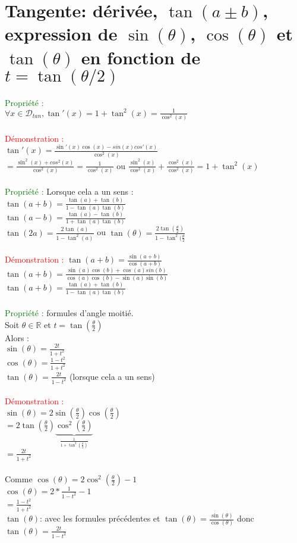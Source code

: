 \documentclass{article}
\begin{document}
	\section{Tangente: dérivée, $\tan (a \pm b)$, expression de $\sin(\theta)$, $\cos(\theta)$ et $\tan(\theta)$ en fonction de $t=\tan(\theta /2)$ }
	\textcolor{green}{Propriété :} \\
	\indent $\forall x \in \mathcal{D}_{tan}, \tan'(x)=1+\tan^2(x)= \frac{1}{\cos^2(x)}$ \\ \\
	\textcolor{red}{Démonstration :} \\
	\indent $\tan'(x)= \frac{\sin'(x)\cos(x)-sin(x)cos'(x)}{\cos^2(x)}$ \\
	\indent $=\frac{\sin^2(x)+cos^2(x)}{\cos^2(x)} = \frac{1}{\cos^2(x)}$ ou $\frac{\sin^2(x)}{\cos^2(x)} + \frac{\cos^2(x)}{\cos^2(x)}= 1 + \tan^2(x)$ \\ \\
	\textcolor{green}{Propriété :} Lorsque cela a un sens : \\
	\indent $\tan(a+b)=\frac{\tan(a)+\tan(b)}{1-\tan(a)\tan(b)}$ \\
	\indent $\tan(a-b)=\frac{\tan(a)-\tan(b)}{1+\tan(a)\tan(b)}$ \\
	\indent $\tan(2a)=\frac{2\tan(a)}{1-\tan^2(a)}$ ou $\tan(\theta)=\frac{2\tan(\frac{\theta}{2})}{1-\tan^2(\frac{\theta}{2}}$ \\\\
	\textcolor{red}{Démonstration :} $\tan(a+b)= \frac{\sin(a+b)}{\cos(a+b)}$ \\
	\indent$\tan(a+b)= \frac{\sin(a)\cos(b)+\cos(a)sin(b)}{\cos(a)\cos(b)-\sin(a)\sin(b)}$\\
	\indent $\tan(a+b)=\frac{\tan(a)+\tan(b)}{1-\tan(a)\tan(b)}$ \\ \\
	\textcolor{green}{Propriété : }formules d'angle moitié. \\
\indent Soit $\theta \in \mathbb{R}$ et $t=\tan(\frac{\theta}{2})$ \\
Alors : \\
 \indent $\sin(\theta)=\frac{2t}{1+t^2}$ \\
 \indent $\cos(\theta)=\frac{1-t^2}{1+t^2}$ \\
 \indent$\tan(\theta)=\frac{2t}{1-t^2}$ (lorsque cela a un sens) \\ \\
\textcolor{red}{Démonstration :} \\
 $\sin(\theta)=2\sin(\frac{\theta}{2})\cos(\frac{\theta}{2})$ \\
 \indent $=2\tan(\frac{\theta}{2})\underbrace{\cos^2(\frac{\theta}{2})}_{\frac{1}{1+\tan^2(\frac{\theta}{2})}}$ \\
 \indent $=\frac{2t}{1+t^2}$ \\ \\
 Comme $\cos(\theta)=2\cos^2(\frac{\theta}{2})-1$ \\
 \indent $\cos(\theta)=2*\frac{1}{1-t^2}-1$ \\
 \indent \indent $= \frac{1-t^2}{1+t^2}$ \\
$\tan(\theta)$: avec les formules précédentes et $\tan(\theta)=\frac{\sin(\theta)}{\cos(\theta)}$ donc $\tan(\theta)=\frac{2t}{1-t^2}$
\end{document}
